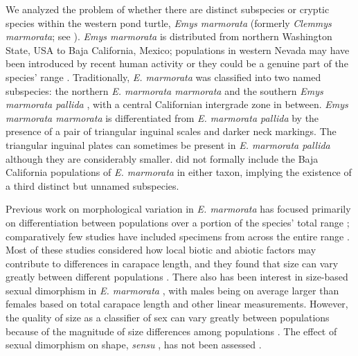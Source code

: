 \documentclass[fleqn,10pt,lineno]{wlpeerj} %
\begin{document}
We analyzed the problem of whether there are distinct subspecies or cryptic species within the western pond turtle, \textit{Emys marmorata} \citep{Baird1852} (formerly \emph{Clemmys marmorata}; see \citealp{Feldman2002}). \textit{Emys marmorata} is distributed from northern Washington State, USA to Baja California, Mexico; populations in western Nevada may have been introduced by recent human activity or they could be a genuine part of the species' range \citep{Bury2017}. Traditionally, \textit{E. marmorata} was classified into two named subspecies: the northern \textit{E. marmorata marmorata} and the southern \textit{Emys marmorata pallida} \citep{Seeliger1945}, with a central Californian intergrade zone in between. \textit{Emys marmorata marmorata} is differentiated from \textit{E. marmorata pallida} by the presence of a pair of triangular inguinal scales and darker neck markings. The triangular inguinal plates can sometimes be present in \textit{E. marmorata pallida} although they are considerably smaller. \citet{Seeliger1945} did not formally include the Baja California populations of \textit{E. marmorata} in either taxon, implying the existence of a third distinct but unnamed subspecies.

Previous work on morphological variation in \textit{E. marmorata} has focused primarily on differentiation between populations over a portion of the species' total range \citep{Lubcke2007,Germano2008,Germano2009,Bury2010}; comparatively few studies have included specimens from across the entire range \citep{Holland1992}. Most of these studies considered how local biotic and abiotic factors may contribute to differences in carapace length, and they found that size can vary greatly between different populations \citep{Lubcke2007,Germano2008,Germano2009}. There also has been interest in size-based sexual dimorphism in \textit{E. marmorata} \citep{Holland1992,Lubcke2007,Germano2009}, with males being on average larger than females based on total carapace length and other linear measurements. However, the quality of size as a classifier of sex can vary greatly between populations \citep{Holland1992} because of the magnitude of size differences among populations \citep{Lubcke2007,Germano2009}. The effect of sexual dimorphism on shape, \textit{sensu} \citet{Kendall1977a}, has not been assessed \citep{Holland1992,Lubcke2007,Germano2008}.
\end{document}
